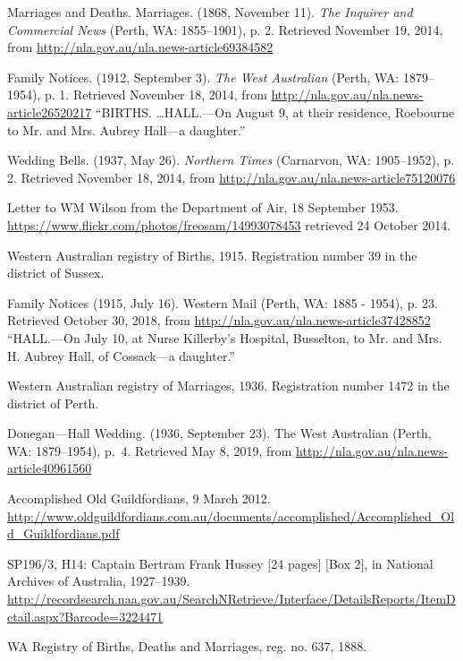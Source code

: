 \begin{thebibliography}{999}
	Marriages and Deaths. Marriages. (1868, November 11).
	\emph{The Inquirer and Commercial News} (Perth, WA: 1855--1901), p. 2.
	Retrieved November 19, 2014, from \url{http://nla.gov.au/nla.news-article69384582}

	Family Notices. (1912, September 3). \emph{The West Australian} (Perth, WA: 1879--1954), p. 1.
	Retrieved November 18, 2014, from \url{http://nla.gov.au/nla.news-article26520217}
	``BIRTHS. \dots HALL.---On August 9, at their residence, Roebourne to Mr. and Mrs. Aubrey Hall---a daughter.''

	Wedding Bells. (1937, May 26). \emph{Northern Times} (Carnarvon, WA: 1905--1952), p. 2.
	Retrieved November 18, 2014, from \url{http://nla.gov.au/nla.news-article75120076}

	Letter to WM Wilson from the Department of Air, 18 September 1953.
	\url{https://www.flickr.com/photos/freosam/14993078453} retrieved 24 October 2014.

	Western Australian registry of Births, 1915. Registration number 39 in the district of Sussex.

	Family Notices (1915, July 16). Western Mail (Perth, WA: 1885 - 1954), p. 23. Retrieved October 30, 2018, from \url{http://nla.gov.au/nla.news-article37428852}
	``HALL.---On July 10, at Nurse Killerby's Hospital, Busselton, to Mr. and Mrs. H. Aubrey Hall, of Cossack---a daughter.''

	Western Australian registry of Marriages, 1936. Registration number 1472 in the district of Perth.

	Donegan---Hall Wedding. (1936, September 23). The West Australian (Perth, WA: 1879--1954), p.\ 4.
	Retrieved May 8, 2019, from \url{http://nla.gov.au/nla.news-article40961560}

	Accomplished Old Guildfordians, 9 March 2012.
	\url{http://www.oldguildfordians.com.au/documents/accomplished/Accomplished_Old_Guildfordians.pdf}

	SP196/3, H14: Captain Bertram Frank Hussey [24 pages] [Box 2], in National Archives of Australia, 1927--1939.
	\url{http://recordsearch.naa.gov.au/SearchNRetrieve/Interface/DetailsReports/ItemDetail.aspx?Barcode=3224471}

	WA Registry of Births, Deaths and Marriages, reg. no. 637, 1888.


\end{thebibliography}
